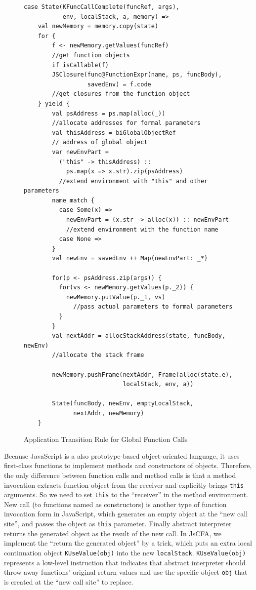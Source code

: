 \documentclass[12pt]{report}
\begin{document}
\begin{figure}
  \lstset{language=Scala}
  \begin{lstlisting}
case State(KFuncCallComplete(funcRef, args),
           env, localStack, a, memory) =>
    val newMemory = memory.copy(state)
    for {
        f <- newMemory.getValues(funcRef)
        //get function objects
        if isCallable(f)
        JSClosure(func@FunctionExpr(name, ps, funcBody),
                  savedEnv) = f.code
        //get closures from the function object
    } yield {
        val psAddress = ps.map(alloc(_))
        //allocate addresses for formal parameters
        val thisAddress = biGlobalObjectRef
        // address of global object
        var newEnvPart =
          ("this" -> thisAddress) ::
            ps.map(x => x.str).zip(psAddress)
          //extend environment with "this" and other parameters
        name match {
          case Some(x) =>
            newEnvPart = (x.str -> alloc(x)) :: newEnvPart
            //extend environment with the function name
          case None =>
        }
        val newEnv = savedEnv ++ Map(newEnvPart: _*)

        for(p <- psAddress.zip(args)) {
          for(vs <- newMemory.getValues(p._2)) {
            newMemory.putValue(p._1, vs)
              //pass actual parameters to formal parameters
          }
        }
        val nextAddr = allocStackAddress(state, funcBody, newEnv)
        //allocate the stack frame

        newMemory.pushFrame(nextAddr, Frame(alloc(state.e),
                            localStack, env, a))

        State(funcBody, newEnv, emptyLocalStack,
              nextAddr, newMemory)
    }

  \end{lstlisting}
  \caption{Application Transition Rule for Global Function Calls}
\label{fig:app-call}
\end{figure}

Because JavaScript is a also prototype-based object-oriented language, it uses first-class functions to implement methods and constructors of objects.
Therefore, the only difference between function calls and method calls is that a method invocation extracts function object from the receiver and explicitly brings \verb|this| arguments. So we need to set \verb|this| to the ``receiver'' in the method environment.
New call (to functions named as constructors) is another type of function invocation form in JavaScript, which generates an empty object at the ``new call site'', and passes the object as \verb|this| parameter. Finally abstract interpreter returns the generated object as the result of the new call.
In JsCFA, we implement the ``return the generated object'' by a trick, which puts an extra local continuation object \verb|KUseValue(obj)| into the new \verb|localStack|.
\verb|KUseValue(obj)| represents a low-level instruction that indicates that abstract interpreter should throw away functions' original return values and use the specific object \verb|obj| that is created at the ``new call site'' to replace.
\end{document}

